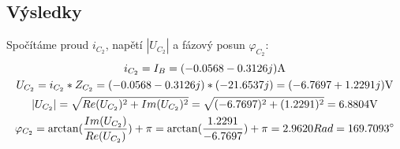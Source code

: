 \subsection{Výsledky}
Spočítáme proud $i_{C_2}$, napětí $|U_{C_{2}}|$ a fázový posun $\varphi_{C_{2}}$:
\begin{gather*}
i_{C_2} = I_B = (-0.0568 - 0.3126j) \Am \\
U_{C_{2}} = i_{C_2} * Z_{C_2} = (-0.0568 - 0.3126j) * (-21.6537j) = (-6.7697 + 1.2291j) \Vo \\
|U_{C_{2}}| = \sqrt{Re(U_{C_{2}})^2 + Im(U_{C_{2}})^2} = \sqrt{(-6.7697)^2 + (1.2291)^2} = 6.8804 \Vo \\
\varphi_{C_{2}} = \arctan(\frac{Im(U_{C_2})}{Re(U_{C_2})}) + \pi = \arctan(\frac{1.2291}{-6.7697}) + \pi = 2.9620 Rad = 169.7093^{\circ}
\end{gather*}

